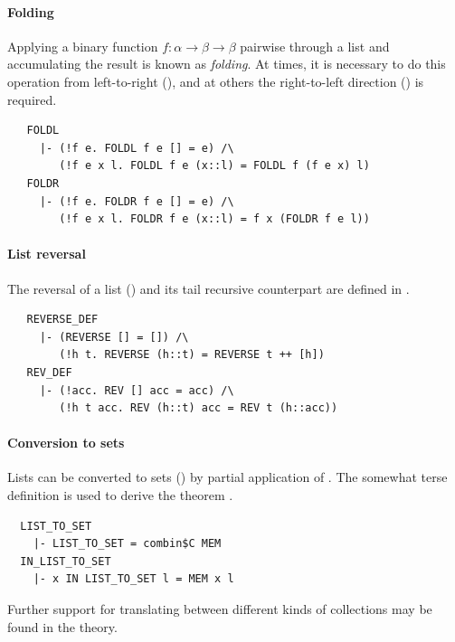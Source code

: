 \paragraph {Folding}

Applying a binary function $f : \alpha\to\beta\to\beta$ pairwise
through a list and accumulating the result is known as
\emph{folding}. At times, it is necessary to do this operation
from left-to-right (), and at others the
right-to-left direction () is required.
\begin{hol}
\begin{verbatim}
   FOLDL
     |- (!f e. FOLDL f e [] = e) /\
        (!f e x l. FOLDL f e (x::l) = FOLDL f (f e x) l)
   FOLDR
     |- (!f e. FOLDR f e [] = e) /\
        (!f e x l. FOLDR f e (x::l) = f x (FOLDR f e l))
\end{verbatim}
\end{hol}

\paragraph {List reversal}

The reversal of a list () and its tail recursive
counterpart  are defined in .
\begin{hol}
\begin{verbatim}
   REVERSE_DEF
     |- (REVERSE [] = []) /\
        (!h t. REVERSE (h::t) = REVERSE t ++ [h])
   REV_DEF
     |- (!acc. REV [] acc = acc) /\
        (!h t acc. REV (h::t) acc = REV t (h::acc))
\end{verbatim}
\end{hol}

\paragraph {Conversion to sets}

Lists can be converted to sets () by partial
application of . The somewhat terse definition is used to
derive the theorem .
%
\begin{hol}
\begin{verbatim}
  LIST_TO_SET
    |- LIST_TO_SET = combin$C MEM
  IN_LIST_TO_SET
    |- x IN LIST_TO_SET l = MEM x l
\end{verbatim}
\end{hol}
%
Further support for translating between different kinds of
collections may be found in the  theory.


